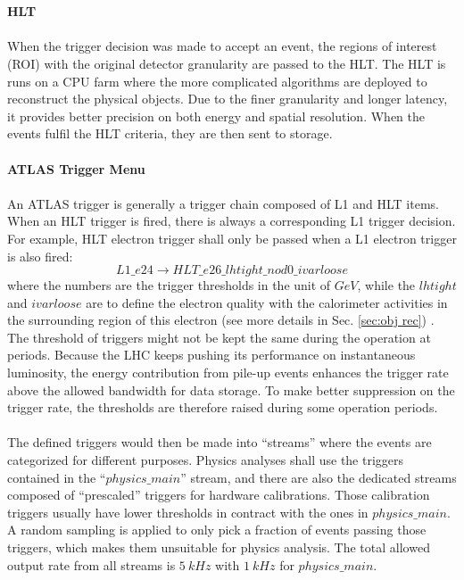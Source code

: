 \\
\\{\bf HLT}
\\
\\When the trigger decision was made to accept an event, the regions of interest (ROI) with the original detector granularity are passed to the HLT. The HLT is runs on a CPU farm where the more complicated algorithms are deployed to reconstruct the physical objects. Due to the finer granularity and longer latency, it provides better precision on both energy and spatial resolution. When the events fulfil the HLT criteria, they are then sent to storage. 
\\
\\{\bf ATLAS Trigger Menu}
\\
\\An ATLAS trigger is generally a trigger chain composed of L1 and HLT items. When an HLT trigger is fired, there is always a corresponding L1 trigger decision. For example, HLT electron trigger shall only be passed when a L1 electron trigger is also fired:
\begin{equation}
L1\_e24 \rightarrow HLT\_e26\_lhtight\_nod0\_ivarloose
\end{equation}
where the numbers are the trigger thresholds in the unit of $GeV$, while the $lhtight$ and $ivarloose$ are to define the electron quality with the calorimeter activities in the surrounding region of this electron (see more details in Sec. \ref{sec:obj rec}) . The threshold of triggers might not be kept the same during the operation at periods. Because the LHC keeps pushing its performance on instantaneous luminosity, the energy contribution from pile-up events enhances the trigger rate above the allowed bandwidth for data storage. To make better suppression on the trigger rate, the thresholds are therefore raised during some operation periods. 
\\
\\The defined triggers would then be made into ``streams'' where the events are categorized for different purposes. Physics analyses shall use the triggers contained in the ``$physics\_main$'' stream, and there are also the dedicated streams composed of ``prescaled'' triggers for hardware calibrations. Those calibration triggers usually have lower thresholds in contract with the ones in $physics\_main$. A random sampling is applied to only pick a fraction of events passing those triggers, which makes them unsuitable for physics analysis. The total allowed output rate from all streams is $5~kHz$ with $1~kHz$ for $physics\_main$. 


